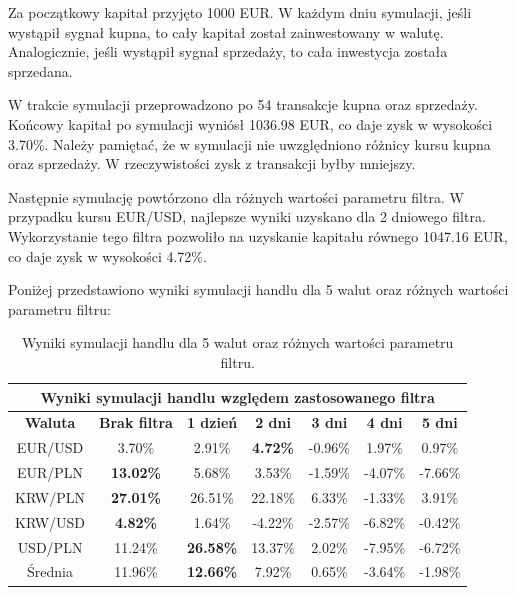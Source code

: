 \documentclass[12pt, a4paper]{article}
\begin{document}
Za początkowy kapitał przyjęto 1000 EUR. W każdym dniu symulacji, jeśli wystąpił sygnał kupna, to cały kapitał
został zainwestowany w walutę. Analogicznie, jeśli wystąpił sygnał sprzedaży, to cała inwestycja została sprzedana.

W trakcie symulacji przeprowadzono po 54 transakcje kupna oraz sprzedaży.
Końcowy kapitał po symulacji wyniósł 1036.98 EUR, co daje zysk w wysokości 3.70\%.
Należy pamiętać, że w symulacji nie uwzględniono różnicy kursu kupna oraz sprzedaży.
W rzeczywistości zysk z transakcji byłby mniejszy.

Następnie symulację powtórzono dla różnych wartości parametru filtra.
W przypadku kursu EUR/USD, najlepsze wyniki uzyskano dla 2 dniowego filtra.
Wykorzystanie tego filtra pozwoliło na uzyskanie kapitału równego 1047.16 EUR,
co daje zysk w wysokości 4.72\%.

Poniżej przedstawiono wyniki symulacji handlu dla 5 walut oraz różnych wartości parametru filtru:


\begin{center}
    \begin{table}[ht]
        \centering
        \begin{tabular}{|c||c|c|c|c|c|c|}
            \hline
            \multicolumn{7}{|c|}{\textbf{Wyniki symulacji handlu względem zastosowanego filtra}}                                           \\
            \hline
            \textbf{Waluta} & \textbf{Brak filtra} & \textbf{1 dzień} & \textbf{2 dni}  & \textbf{3 dni} & \textbf{4 dni} & \textbf{5 dni} \\
            \hline
            EUR/USD         & 3.70\%               & 2.91\%           & \textbf{4.72\%} & -0.96\%        & 1.97\%         & 0.97\%         \\
            \hline
            EUR/PLN         & \textbf{13.02\%}     & 5.68\%           & 3.53\%          & -1.59\%        & -4.07\%        & -7.66\%        \\
            \hline
            KRW/PLN         & \textbf{27.01\%}     & 26.51\%          & 22.18\%         & 6.33\%         & -1.33\%        & 3.91\%         \\
            \hline
            KRW/USD         & \textbf{4.82\%}      & 1.64\%           & -4.22\%         & -2.57\%        & -6.82\%        & -0.42\%        \\
            \hline
            USD/PLN         & 11.24\%              & \textbf{26.58\%} & 13.37\%         & 2.02\%         & -7.95\%        & -6.72\%        \\
            \hline
            \hline
            Średnia         & 11.96\%              & \textbf{12.66\%} & 7.92\%          & 0.65\%         & -3.64\%        & -1.98\%        \\
            \hline
        \end{tabular}
        \caption{Wyniki symulacji handlu dla 5 walut oraz różnych wartości parametru filtru.}
        \label{tab:results}
    \end{table}
\end{center}
\end{document}

